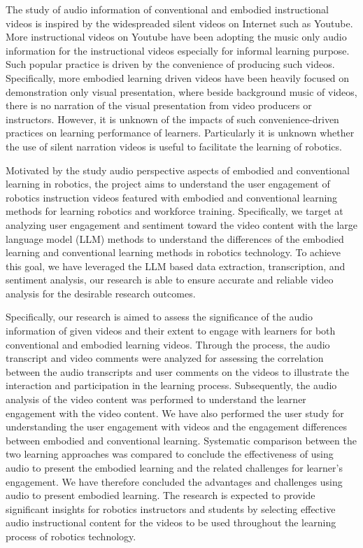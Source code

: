 \documentclass[fleqn,10pt]{JLA_article} %
\begin{document}
The study of audio information of conventional and embodied instructional videos is inspired by the widespreaded silent videos on Internet such as Youtube. More instructional videos on Youtube have been adopting the music only audio information for the instructional videos especially for informal learning purpose. Such popular practice is driven by the convenience of producing such videos. Specifically, more embodied learning driven videos have been heavily focused on demonstration only visual presentation, where beside background music of videos, there is no narration of the visual presentation from video producers or instructors. However, it is unknown of the impacts of such convenience-driven practices on learning performance of learners. Particularly it is unknown whether the use of silent narration videos is useful to facilitate the learning of robotics.

Motivated by the study audio perspective aspects of embodied and conventional learning in robotics, the project aims to understand the user engagement of robotics instruction videos featured with embodied and conventional learning methods for learning robotics and workforce training. Specifically, we target at analyzing user engagement and sentiment toward the video content with the large language model (LLM) methods to understand the differences of the embodied learning and conventional learning methods in robotics technology. To achieve this goal, we have leveraged the LLM based data extraction, transcription, and sentiment analysis, our research is able to ensure accurate and reliable video analysis for the desirable research outcomes.

Specifically, our research is aimed to assess the significance of the audio information of given videos and their extent to engage with learners for both conventional and embodied learning videos. Through the process, the audio transcript and video comments were analyzed for assessing the correlation between the audio transcripts and user comments on the videos to illustrate the interaction and participation in the learning process. Subsequently, the audio analysis of the video content was performed to understand the learner engagement with the video content. We have also performed the user study for understanding the user engagement with videos and the engagement differences between embodied and conventional learning. Systematic comparison between the two learning approaches was compared to conclude the effectiveness of using audio to present the embodied learning and the related challenges for learner's engagement. We have therefore concluded the advantages and challenges using audio to present embodied learning. The research is expected to provide significant insights for robotics instructors and students by selecting effective audio instructional content for the videos to be used throughout the learning process of robotics technology.
\end{document}
